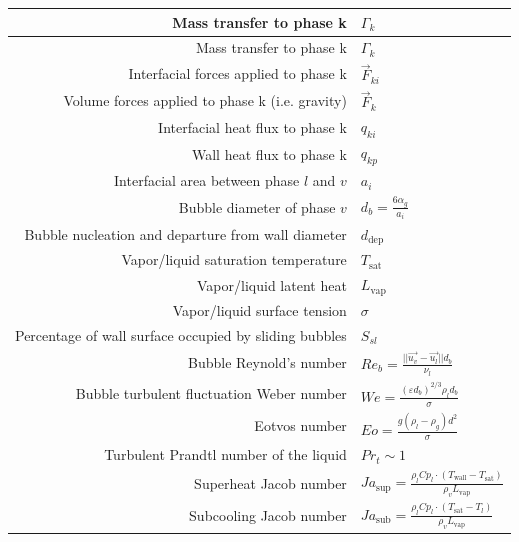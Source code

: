 \documentclass[a4paper,12pt]{report}
\newcommand{\1}{\mathds 1}
\renewcommand{\vec}{\overrightarrow}
\begin{document}
\begin{center}
\begin{tabular}{|r|l|}
	Mass transfer to phase k
		& $\Gamma_k $ \\ \hline
	Mass transfer to phase k
		& $\Gamma_k $ \\ \hline
	Interfacial forces applied to phase k
		& $\vec{F}_{ki}$  \\ \hline
	Volume forces applied to phase k (i.e. gravity)
		& $\vec{F}_k$  \\ \hline
	Interfacial heat flux to phase k
		& $q_{ki}$ \\ \hline
	Wall heat flux to phase k
		& $q_{kp} $ \\ \hline
	Interfacial area between phase $l$ and $v$
		& $a_i$ \\ \hline
	Bubble diameter of phase $v$
		& $	d_b = \frac{6 \alpha_g}{a_i} $ \\ \hline
	Bubble nucleation and departure from wall diameter
		& $d_\text{dep}$ \\ \hline
	Vapor/liquid saturation temperature
		& $T_\text{sat}$ \\ \hline
	Vapor/liquid latent heat
		& $L_\text{vap}$ \\ \hline
	Vapor/liquid surface tension
		& $\sigma$ \\ \hline
	Percentage of wall surface occupied by sliding bubbles
		& $S_{sl}$ \\ \hline
	Bubble Reynold's number
		& $Re_b = \frac{||\overrightarrow{u_v}-\overrightarrow{u_l}|| d_b}{\nu_l}$ \\ \hline
	Bubble turbulent fluctuation Weber number
		& $We = \frac{(\varepsilon d_b)^{2/3} \rho_l d_b}{\sigma}$ \\ \hline
	Eotvos number
		&  $Eo = \frac{g(\rho_l-\rho_g)d^2}{\sigma}$ \\ \hline
	Turbulent Prandtl number of the liquid 
		& $Pr_t \sim 1 $ \\ \hline
	Superheat Jacob number
		& $Ja_\text{sup} = \frac{\rho_l Cp_l \cdot (T_\text{wall} - T_\text{sat})}{\rho_v L_\text{vap}}$ \\ \hline
	Subcooling Jacob number	
		& $Ja_\text{sub} = \frac{\rho_l Cp_l \cdot (T_\text{sat} - T_l)}{\rho_v L_\text{vap}}$ \\ \hline
\end{tabular}
\end{center}

\pagebreak


\cleardoublepage

\cleardoublepage


\cleardoublepage
\end{document}
